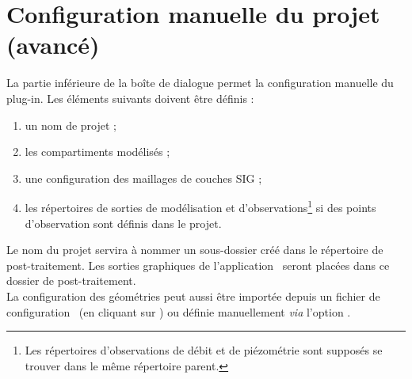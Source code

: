 \chapter{Configuration manuelle du projet (avancé)}
\label{sec-config-manual}

\renewcommand{\headrulewidth}{0.3pt}
\fancyhead[LE]{\thepage} \fancyhead[RE]{\nouppercase{\textbf{\leftmark}}}
\fancyhead[RO]{\thepage} \fancyhead[LO]{\nouppercase{\textbf{\rightmark}}}
\fancyfoot[L,C,R]{}

\setlength{\parindent}{0.35cm}

\minitoc
\newpage


La partie inférieure de la boîte de dialogue  permet la configuration manuelle du plug-in. Les éléments suivants doivent être définis :
\begin{enumerate}
    \item un nom de projet ;

    \item les compartiments modélisés ;

    \item une configuration des maillages de couches SIG ;

    \item les répertoires de sorties de modélisation et d'observations\footnote{Les répertoires d'observations de débit et de piézométrie sont supposés se trouver dans le même répertoire parent.} si des points d'observation sont définis dans le projet.
\end{enumerate}

Le nom du projet servira à nommer un sous-dossier créé dans le répertoire de post-traitement. Les sorties graphiques de l'application \cwv~seront placées dans ce dossier de post-traitement.\\

La configuration des géométries peut aussi être importée depuis un fichier de configuration \json~(en cliquant sur ) ou définie manuellement \textit{via} l'option .

